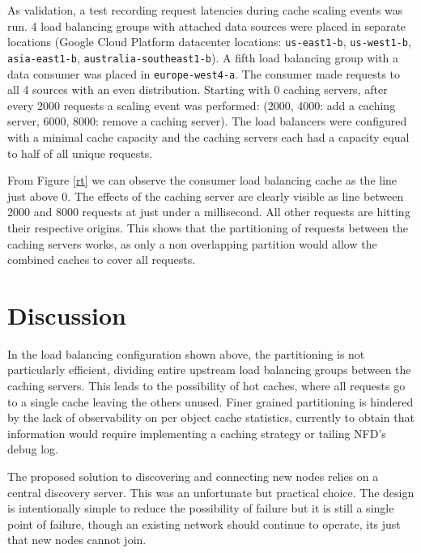 \documentclass[letterpaper,12pt]{article}
\begin{document}
As validation, a test recording request latencies during cache scaling events was run.
4 load balancing groups with attached data sources were placed in separate locations
(Google Cloud Platform datacenter locations:
\texttt{us-east1-b}, \texttt{us-west1-b}, \texttt{asia-east1-b}, \texttt{australia-southeast1-b}).
A fifth load balancing group with a data consumer was placed in \texttt{europe-west4-a}.
The consumer made requests to all 4 sources with an even distribution.
Starting with 0 caching servers, after every 2000 requests a scaling event was performed:
(2000, 4000: add a caching server, 6000, 8000: remove a caching server).
The load balancers were configured with a minimal cache capacity
and the caching servers each had a capacity equal to half of all unique requests.


From Figure \ref{rt} we can observe the consumer load balancing cache as the line just above 0.
The effects of the caching server are clearly visible as line between 2000 and 8000 requests
at just under a millisecond.
All other requests are hitting their respective origins.
This shows that the partitioning of requests between the caching servers works,
as only a non overlapping partition would allow the combined caches to cover all requests.




\section*{Discussion}


In the load balancing configuration shown above, the partitioning is not particularly efficient, dividing entire upstream load balancing groups between the caching servers. This leads to the possibility of hot caches, where all requests go to a single cache leaving the others unused. Finer grained partitioning is hindered by the lack of observability on per object cache statistics, currently to obtain that information would require implementing a caching strategy or tailing NFD's debug log.

The proposed solution to discovering and connecting new nodes relies on a central discovery server. This was an unfortunate but practical choice. The design is intentionally simple to reduce the possibility of failure but it is still a single point of failure, though an existing network should continue to operate, its just that new nodes cannot join.
\end{document}
